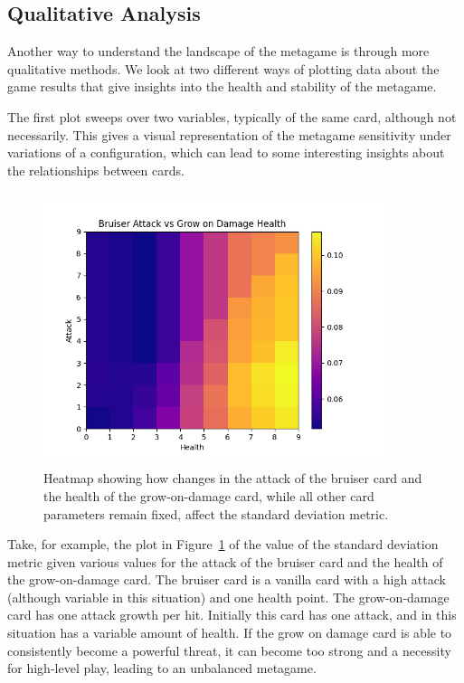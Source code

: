 \subsection{Qualitative Analysis} \label{sec:qualitative-analysis}

Another way to understand the landscape of the metagame is through more qualitative methods. We look at two different ways of plotting data about the game results that give insights into the health and stability of the metagame. 

The first plot sweeps over two variables, typically of the same card, although not necessarily. This gives a visual representation of the metagame sensitivity under variations of a configuration, which can lead to some interesting insights about the relationships between cards.

\begin{figure}[t]
	\includegraphics[width=10cm, height=8cm]{bruiser_vs_grow} 
	\caption{Heatmap showing how changes in the attack of the bruiser card and the health of the grow-on-damage card, while all other card parameters remain fixed, affect the standard deviation metric.}
	\label{fig:bruiser_vs_grow}
\end{figure}

Take, for example, the plot in Figure~\ref{fig:bruiser_vs_grow} of the value of the standard deviation metric given various values for the attack of the bruiser card and the health of the grow-on-damage card. The bruiser card is a vanilla card with a high attack (although variable in this situation) and one health point. The grow-on-damage card has one attack growth per hit. Initially this card has one attack, and in this situation has a variable amount of health. If the grow on damage card is able to consistently become a powerful threat, it can become too strong and a necessity for high-level play, leading to an unbalanced metagame.

